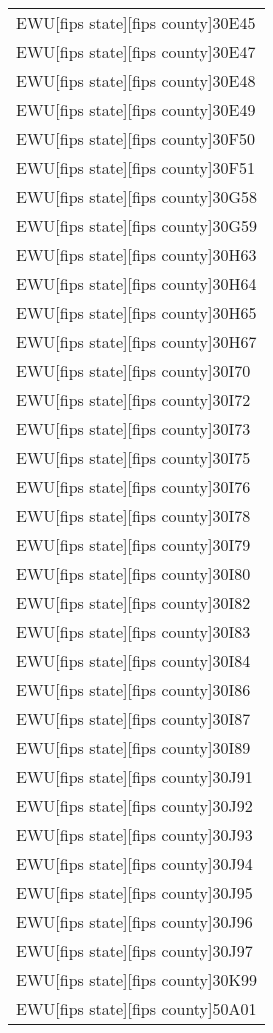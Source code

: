 \begin{supertabular}{l}
EWU[fips state][fips county]30E45\\
EWU[fips state][fips county]30E47\\
EWU[fips state][fips county]30E48\\
EWU[fips state][fips county]30E49\\
EWU[fips state][fips county]30F50\\
EWU[fips state][fips county]30F51\\
EWU[fips state][fips county]30G58\\
EWU[fips state][fips county]30G59\\
EWU[fips state][fips county]30H63\\
EWU[fips state][fips county]30H64\\
EWU[fips state][fips county]30H65\\
EWU[fips state][fips county]30H67\\
EWU[fips state][fips county]30I70\\
EWU[fips state][fips county]30I72\\
EWU[fips state][fips county]30I73\\
EWU[fips state][fips county]30I75\\
EWU[fips state][fips county]30I76\\
EWU[fips state][fips county]30I78\\
EWU[fips state][fips county]30I79\\
EWU[fips state][fips county]30I80\\
EWU[fips state][fips county]30I82\\
EWU[fips state][fips county]30I83\\
EWU[fips state][fips county]30I84\\
EWU[fips state][fips county]30I86\\
EWU[fips state][fips county]30I87\\
EWU[fips state][fips county]30I89\\
EWU[fips state][fips county]30J91\\
EWU[fips state][fips county]30J92\\
EWU[fips state][fips county]30J93\\
EWU[fips state][fips county]30J94\\
EWU[fips state][fips county]30J95\\
EWU[fips state][fips county]30J96\\
EWU[fips state][fips county]30J97\\
EWU[fips state][fips county]30K99\\
EWU[fips state][fips county]50A01\\

\end{supertabular}
